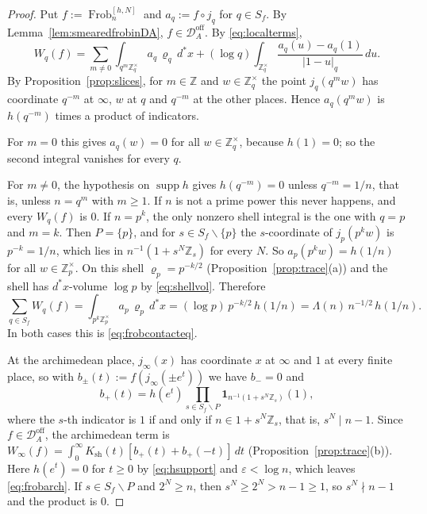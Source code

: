 \documentclass[11pt]{amsart}
\theoremstyle{definition}
\newcommand{\Z}{\mathbb Z}
\newcommand{\Frob}{\operatorname{Frob}}
\newcommand{\supp}{\operatorname{supp}}
\newcommand{\Ksh}{K_{\mathrm{sh}}}
\newcommand{\Doff}{\mathcal D_A^{\mathrm{off}}}
\begin{document}
\begin{proof}
Put $f:=\Frob_n^{[h,N]}$ and $a_q:=f\circ j_q$ for $q\in S_f$. By
Lemma~\ref{lem:smearedfrobinDA}, $f\in\Doff$. By \eqref{eq:localterms},
\[
  W_q(f)=\sum_{m\ne0}\int_{q^m\Z_q^\times}a_q\,\varrho_q\,d^*x
   +(\log q)\int_{\Z_q^\times}\frac{a_q(u)-a_q(1)}{|1-u|_q}\,du .
\]
By Proposition~\ref{prop:slices}, for $m\in\Z$ and $w\in\Z_q^\times$ the point
$j_q(q^mw)$ has coordinate $q^{-m}$ at $\infty$, $w$ at $q$ and $q^{-m}$ at
the other places. Hence $a_q(q^mw)$ is $h(q^{-m})$ times a product of
indicators.

For $m=0$ this gives $a_q(w)=0$ for all $w\in\Z_q^\times$, because
$h(1)=0$; so the second integral vanishes for every $q$.

For $m\ne0$, the hypothesis on $\supp h$ gives $h(q^{-m})=0$ unless
$q^{-m}=1/n$, that is, unless $n=q^m$ with $m\ge1$. If $n$ is not a prime
power this never happens, and every $W_q(f)$ is $0$. If $n=p^k$, the only
nonzero shell integral is the one with $q=p$ and $m=k$. Then $P=\{p\}$, and
for $s\in S_f\smallsetminus\{p\}$ the $s$-coordinate of $j_p(p^kw)$ is
$p^{-k}=1/n$, which lies in $n^{-1}(1+s^N\Z_s)$ for every $N$. So
$a_p(p^kw)=h(1/n)$ for all $w\in\Z_p^\times$. On this shell
$\varrho_p=p^{-k/2}$ (Proposition~\ref{prop:trace}(a)) and the shell has $d^*x$-volume $\log p$ by
\eqref{eq:shellvol}. Therefore
\[
  \sum_{q\in S_f}W_q(f)=\int_{p^k\Z_p^\times}a_p\,\varrho_p\,d^*x
  =(\log p)\,p^{-k/2}\,h(1/n)=\Lambda(n)\,n^{-1/2}\,h(1/n).
\]
In both cases this is \eqref{eq:frobcontacteq}.

At the archimedean place, $j_\infty(x)$ has coordinate $x$ at $\infty$ and
$1$ at every finite place, so with $b_\pm(t):=f(j_\infty(\pm e^t))$ we have
$b_-=0$ and
\[
  b_+(t)=h(e^t)\prod_{s\in S_f\smallsetminus P}
   \mathbf 1_{n^{-1}(1+s^N\Z_s)}(1),
\]
where the $s$-th indicator is $1$ if and only if $n\in1+s^N\Z_s$, that is,
$s^N\mid n-1$. Since $f\in\Doff$, the archimedean term is
$W_\infty(f)=\int_0^\infty \Ksh(t)[b_+(t)+b_+(-t)]\,dt$
(Proposition~\ref{prop:trace}(b)). Here
$h(e^t)=0$ for $t\ge0$ by \eqref{eq:hsupport} and $\varepsilon<\log n$, which
leaves \eqref{eq:frobarch}. If $s\in S_f\smallsetminus P$ and $2^N\ge n$,
then $s^N\ge2^N>n-1\ge1$, so $s^N\nmid n-1$ and the product is $0$.
\end{proof}
\end{document}

